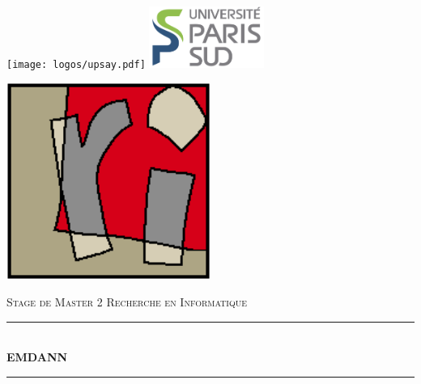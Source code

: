 \documentclass[oneside]{memoir}
\newcommand{\HRule}{\rule{\linewidth}{0.5mm}}
\begin{document}
\begin{titlingpage}
 
\begin{center}
 
% 
\texttt{[image: logos/upsay.pdf]} \hfill %
\includegraphics[height=2cm]{logos/ups.png} %
\\[1.5cm]


\begin{minipage}{0.2\textwidth}
\end{minipage}
\begin{minipage}{0.2\textwidth}
  \begin{flushright}
    \includegraphics[width=0.5\textwidth]{logos/lri.png}
  \end{flushright}
\end{minipage}


\vspace{2cm} 
\textsc{\Large Stage de Master 2 Recherche en Informatique}\\[0.5cm]
 
 
\HRule \\[0.4cm]
{ \huge \bfseries EMDANN}\\[0.4cm]
 
\HRule \\[1.5cm]
 

\end{center}
\end{titlingpage}
\end{document}
